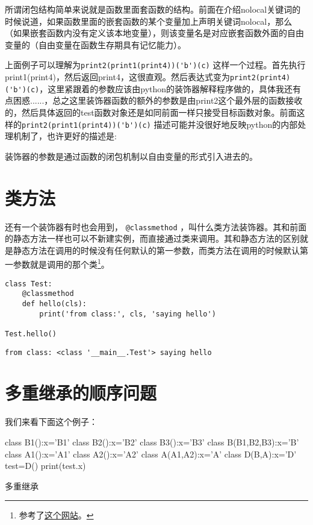 \documentclass[12pt,oneside]{book}
\begin{document}
\begin{common-format}
所谓闭包结构简单来说就是函数里面套函数的结构。前面在介绍nolocal关键词的时候说道，如果函数里面的嵌套函数的某个变量加上声明关键词nolocal，那么（如果嵌套函数内没有定义该本地变量），则该变量名是对应嵌套函数外面的自由变量的（自由变量在函数生存期具有记忆能力）。

上面例子可以理解为\verb+print2(print1(print4))('b')(c)+ 这样一个过程。首先执行print1(print4)，然后返回print4，这很直观。然后表达式变为\verb+print2(print4)('b')(c)+，这里紧跟着的参数应该由python的装饰器解释程序做的，具体我还有点困惑......，总之这里装饰器函数的额外的参数是由print2这个最外层的函数接收的，然后具体返回的test函数对象还是如同前面一样只接受目标函数对象。前面这样的\verb+print2(print1(print4))('b')(c)+ 描述可能并没很好地反映python的内部处理机制了，也许更好的描述是:

装饰器的参数是通过函数的闭包机制以自由变量的形式引入进去的。


\section{类方法}
还有一个装饰器有时也会用到， \verb+@classmethod+ ，叫什么类方法装饰器。其和前面的静态方法一样也可以不新建实例，而直接通过类来调用。其和静态方法的区别就是静态方法在调用的时候没有任何默认的第一参数，而类方法在调用的时候默认第一参数就是调用的那个类\footnote{参考了\href{http://stackoverflow.com/questions/136097/what-is-the-difference-between-staticmethod-and-classmethod-in-python}{这个网站}。}。

\begin{Verbatim}
class Test:
    @classmethod
    def hello(cls):
        print('from class:', cls, 'saying hello')

Test.hello()
\end{Verbatim}
\begin{Verbatim}
from class: <class '__main__.Test'> saying hello
\end{Verbatim}



\section{多重继承的顺序问题}
我们来看下面这个例子：
\begin{tcbpython}[]
class B1():x='B1'
class B2():x='B2'
class B3():x='B3'
class B(B1,B2,B3):x='B'
class A1():x='A1'
class A2():x='A2'
class A(A1,A2):x='A'
class D(B,A):x='D'
test=D()
print(test.x)
\end{tcbpython}

\begin{fig}{多重继承}
\caption{多重继承}
\label{fig:多重继承}
\end{fig}


\end{common-format}
\end{document}
